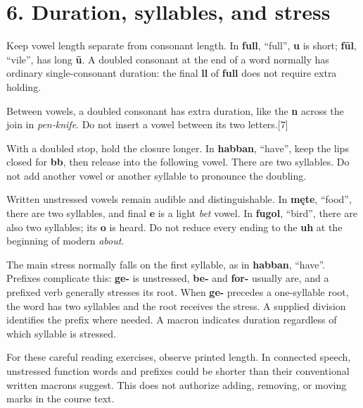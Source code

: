 \section*{6. Duration, syllables, and stress}

Keep vowel length separate from consonant length. In \textbf{full}, “full”, \textbf{u} is short; \textbf{fūl}, “vile”, has long \textbf{ū}. A doubled consonant at the end of a word normally has ordinary single-consonant duration: the final \textbf{ll} of \textbf{full} does not require extra holding.

Between vowels, a doubled consonant has extra duration, like the \textbf{n} across the join in \emph{pen-knife}. Do not insert a vowel between its two letters.[7]

With a doubled stop, hold the closure longer. In \textbf{habban}, “have”, keep the lips closed for \textbf{bb}, then release into the following vowel. There are two syllables. Do not add another vowel or another syllable to pronounce the doubling.

Written unstressed vowels remain audible and distinguishable. In \textbf{męte}, “food”, there are two syllables, and final \textbf{e} is a light \emph{bet} vowel. In \textbf{fugol}, “bird”, there are also two syllables; its \textbf{o} is heard. Do not reduce every ending to the \textbf{uh} at the beginning of modern \emph{about}.

The main stress normally falls on the first syllable, as in \textbf{habban}, “have”. Prefixes complicate this: \textbf{ge-} is unstressed, \textbf{be-} and \textbf{for-} usually are, and a prefixed verb generally stresses its root. When \textbf{ge-} precedes a one-syllable root, the word has two syllables and the root receives the stress. A supplied division identifies the prefix where needed. A macron indicates duration regardless of which syllable is stressed.

For these careful reading exercises, observe printed length. In connected speech, unstressed function words and prefixes could be shorter than their conventional written macrons suggest. This does not authorize adding, removing, or moving marks in the course text.


